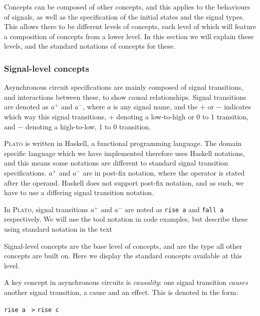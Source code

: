 \documentclass[british, 10pt, conference, compsocconf]{IEEEtran}
\newcommand{\noun}[1]{\textsc{#1}}
\begin{document}
Concepts can be composed of other concepts, and this applies to the behaviours 
of signals, as well as the specification of the initial states and the signal 
types. This allows there to be different levels of concepts, each level of 
which will feature a composition of concepts from a lower level. In this section we will explain these levels, and the standard notations of 
concepts for these. 


\subsubsection{\label{signal-level}Signal-level concepts}Asynchronous circuit 
specifications are mainly composed of signal transitions, and interactions 
between these, to show causal relationships. Signal transitions are denoted as 
$a^{+}$ and $a^{-}$, where $a$ is any signal name, and 
the $+$ or $-$ indicates which way this signal transitions, $+$ denoting a 
low-to-high or 0 to 1 transition, and $-$ denoting a high-to-low, 1 to 0 
transition. 

\noun{Plato} is written in Haskell, a functional programming language. The 
domain specific language which we have implemented therefore uses Haskell 
notations, and this means some notations are different to standard signal 
transition specifications. $a^{+}$ and $a^{-}$ are in post-fix notation, where 
the operator is stated after the operand. Haskell does not support post-fix 
notation, and as such, we have to use a differing signal transition notation. 

In \noun{Plato}, signal transitions $a^{+}$ and $a^{-}$ are noted as \texttt{rise a} and 
\texttt{fall a} respectively. We will use the tool notation in code examples, but describe these using standard notation in the text

Signal-level concepts are the base level of concepts, and are 
the type all other concepts are built on. Here we display the standard concepts
available at this level.

A key concept in asynchronous circuits is \emph{causality}:
one signal transition \emph{causes} another signal transition, a cause and an 
effect. This is denoted in the form: 

\vspace{-1.5mm}

\begin{center}
{\texttt{rise a} \texttt{~>} \texttt{rise c}}
\end{center}
\end{document}
